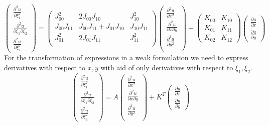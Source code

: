 \documentclass[a4paper,12pt]{article}
\begin{document}
$$
\left(\begin{array}{c}
\frac{\partial^2 u}{\partial \xi_1^2} \\[3mm]
\frac{\partial^2 u}{\partial \xi_1 \partial \xi_2} \\[3mm]
\frac{\partial^2 u}{\partial \xi_2^2}
\end{array}\right) =
\left(\begin{array}{ccc}
J_{00}^2 & 2J_{00}J_{10} & J_{10}^2 \\[3mm]
J_{00}J_{01} & J_{00}J_{11} + J_{01}J_{10} & J_{10}J_{11} \\[3mm]
J_{01}^2 & 2J_{01}J_{11} & J_{11}^2 \\[3mm]
\end{array}\right)
\left(\begin{array}{c}
\frac{\partial^2 u}{\partial x^2} \\[3mm]
\frac{\partial^2 u}{\partial x \partial y} \\[3mm]
\frac{\partial^2 u}{\partial y^2} \\[3mm]
\end{array}\right) +
\left(\begin{array}{cc}
K_{00} & K_{10}\\[3mm]
K_{01} & K_{11}\\[3mm]
K_{02} & K_{12}
\end{array}\right)
\left(\begin{array}{c}
\frac{\partial u}{\partial x} \\[3mm]
\frac{\partial u}{\partial y}
\end{array}\right)
$$
For the transformation of expressions in a weak formulation we need to express derivatives with respect to $x,y$ with aid of only derivatives with respect to $\xi_1, \xi_2$.
$$
\left(\begin{array}{c}
\frac{\partial^2 u}{\partial \xi_1^2} \\[3mm]
\frac{\partial^2 u}{\partial \xi_1 \partial \xi_2} \\[3mm]
\frac{\partial^2 u}{\partial \xi_2^2}
\end{array}\right) =
A
\left(\begin{array}{c}
\frac{\partial^2 u}{\partial x^2} \\[3mm]
\frac{\partial^2 u}{\partial x \partial y} \\[3mm]
\frac{\partial^2 u}{\partial y^2} \\[3mm]
\end{array}\right) +
K^T
\left(\begin{array}{c}
\frac{\partial u}{\partial x} \\[3mm]
\frac{\partial u}{\partial y}
\end{array}\right)
$$
\end{document}
